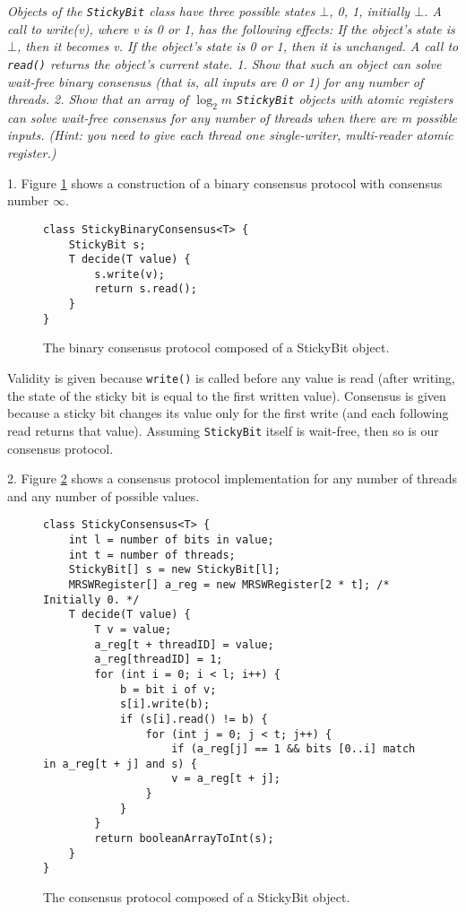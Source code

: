 \documentclass[a4paper,10pt]{article}
\begin{document}
\emph{Objects of the \lstinline|StickyBit| class have three possible states $\bot$, 0, 1,
initially $\bot$. A call to write(v), where v is 0 or 1, has the following effects:
If the object’s state is $\bot$, then it becomes v.
If the object’s state is 0 or 1, then it is unchanged.
A call to \lstinline|read()| returns the object’s current state.
1. Show that such an object can solve wait-free binary consensus (that is, all
inputs are 0 or 1) for any number of threads.
2. Show that an array of $\log_2 m$ \lstinline|StickyBit| objects with atomic registers can
solve wait-free consensus for any number of threads when there are m possible inputs. (Hint: you need to give each thread one single-writer, multi-reader
atomic register.)}

\vspace{3mm}

1. Figure \ref{fig:binarystickyconsensus} shows a construction of a binary consensus protocol with consensus number $\infty$.

\begin{figure}
\begin{lstlisting}
class StickyBinaryConsensus<T> {
    StickyBit s;
    T decide(T value) {
        s.write(v);
        return s.read();
    }
}
\end{lstlisting}
\caption{The binary consensus protocol composed of a StickyBit object.}
\label{fig:binarystickyconsensus}
\end{figure}

Validity is given because \lstinline|write()| is called before any value is read (after writing, the state of the sticky bit is equal to the first written value). Consensus is given because a sticky bit changes its value only for the first write (and each following read returns that value). Assuming \lstinline|StickyBit| itself is wait-free, then so is our consensus protocol.

2. Figure \ref{fig:stickyconsensus} shows a consensus protocol implementation for any number of threads and any number of possible values.

\begin{figure}
\begin{lstlisting}
class StickyConsensus<T> {
    int l = number of bits in value;
    int t = number of threads;
    StickyBit[] s = new StickyBit[l];
    MRSWRegister[] a_reg = new MRSWRegister[2 * t]; /* Initially 0. */
    T decide(T value) {
        T v = value;
        a_reg[t + threadID] = value;
        a_reg[threadID] = 1;
        for (int i = 0; i < l; i++) {
            b = bit i of v;
            s[i].write(b);
            if (s[i].read() != b) {
                for (int j = 0; j < t; j++) {
                    if (a_reg[j] == 1 && bits [0..i] match in a_reg[t + j] and s) {
                    v = a_reg[t + j];
                }
            }
        }
        return booleanArrayToInt(s);
    }
}
\end{lstlisting}
\caption{The consensus protocol composed of a StickyBit object.}
\label{fig:stickyconsensus}
\end{figure}
\end{document}
